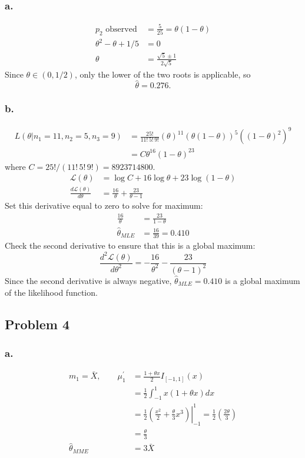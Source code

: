 \documentclass{article}
\begin{document}
\subsubsection{a.}
\begin{align*} 
p_2 \text{  observed} &= \frac{5}{25} = \theta(1-\theta) \\
\theta^2 - \theta +1/5 &= 0 \\
\theta &= \frac{\sqrt{5} \pm 1}{2\sqrt{5}}
\end{align*}
Since $\theta \in (0, 1/2)$, only the lower of the two roots is applicable, so \[\hat{\theta} = 0.276.\]

\subsubsection*{b.}
\begin{align*}
L(\theta|n_1=11, n_2=5, n_3=9) &= \frac{25!}{11!\,5!\,9!} \left(\theta\right)^11\left(\theta(1-\theta)\right)^5\left(\left(1-\theta\right)^2\right)^9 \\
&=C\theta^{16}\left(1-\theta\right)^{23}
\end{align*}
where $C = 25!/(11!\,5!\,9!) = 8923714800$.
\begin{align*}
\mathcal{L}(\theta) &= \log{C} + 16 \log{\theta} + 23 \log{(1-\theta)} \\
\frac{d\mathcal{L}(\theta)}{d\theta} &= \frac{16}{\theta}+\frac{23}{\theta-1}
\end{align*}
Set this derivative equal to zero to solve for maximum:
\begin{align*}
\frac{16}{\theta} &= \frac{23}{1-\theta} \\
\hat{\theta}_{MLE} &= \frac{16}{39} = 0.410
\end{align*}
Check the second derivative to ensure that this is a global maximum:
\[\frac{d^2\mathcal{L}(\theta)}{d\theta^2} = -\frac{16}{\theta^2}-\frac{23}{(\theta-1)^2}\]
Since the second derivative is always negative, $\hat{\theta}_{MLE} = 0.410$ is a global maximum of the likelihood function. 

\subsection*{Problem 4}
\subsubsection*{a.}
\begin{align*}
m_1 = \bar{X},\quad\quad \mu_1^\prime&=\frac{1+\theta x}{2}I_{[-1,1]}(x) \\
&=\frac{1}{2}\int_{-1}^1 x\left(1+\theta x\right)dx \\
&= \frac{1}{2}\left.\left(\frac{x^2}{2}+\frac{\theta}{3}x^3\right)\right|_{-1}^1 = \frac{1}{2}\left(\frac{2\theta}{3}\right) \\
&= \frac{\theta}{3} \\
\hat{\theta}_{MME} &= 3\bar{X}
\end{align*}
\end{document}
